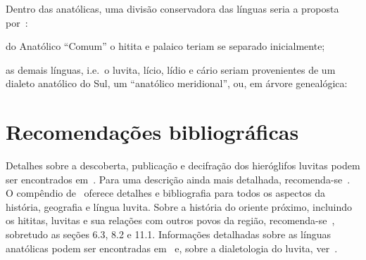 Dentro das anatólicas, uma divisão conservadora das línguas seria a proposta
por~\citet[305--6]{Rieken2017}:
\begin{inparaenum}
	\item do Anatólico ``Comum'' o hitita e palaico teriam se separado
	inicialmente;
	\item as demais línguas, i.e.\ o luvita, lício, lídio e cário seriam
	provenientes de um dialeto anatólico do Sul, um
	``anatólico meridional'', ou, em árvore genealógica:
\end{inparaenum}

\vspace{3pt}
\begin{center}
\end{center}


\section{Recomendações bibliográficas}

Detalhes sobre a descoberta, publicação e decifração dos hieróglifos luvitas
podem ser encontrados em~\citet[pp. 131ff.]{HawkinsScripts}. Para uma descrição
ainda mais detalhada, recomenda-se~\citet[pp. 6-17]{CHLI11}.
O compêndio de~\citet{Melchert2003} oferece detalhes e bibliografia para todos
os aspectos da história, geografia e língua luvita.
Sobre a história do oriente próximo, incluindo os hititas, luvitas e sua
relações com outros povos da região, recomenda-se~\citet{Mieroop2015}, sobretudo
as seções 6.3, 8.2 e 11.1.
Informações detalhadas sobre as línguas anatólicas podem ser encontradas
em~\citet[239--308]{HSK41.1} e, sobre a dialetologia do luvita,
ver~\citet{Yakubovich2010}.
